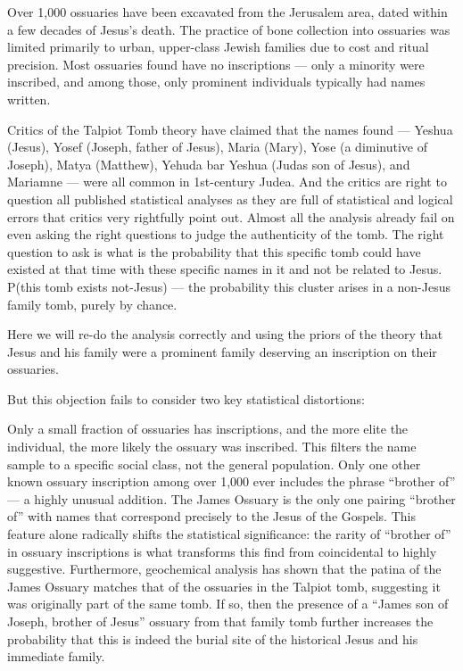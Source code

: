 Over 1,000 ossuaries have been excavated from the Jerusalem area, dated within a few decades of Jesus's death.
The practice of bone collection into ossuaries was limited primarily to urban, upper-class Jewish families due to cost and ritual precision.
Most ossuaries found have no inscriptions --- only a minority were inscribed, and among those, only prominent individuals typically had names written.

Critics of the Talpiot Tomb theory have claimed that the names found --- Yeshua (Jesus), Yosef (Joseph, father of Jesus), Maria (Mary), Yose (a diminutive of Joseph), Matya (Matthew), Yehuda bar Yeshua (Judas son of Jesus), and Mariamne --- were all common in 1st-century Judea.
And the critics are right to question all published statistical analyses as they are full of statistical and logical errors that critics very rightfully point out.
Almost all the analysis already fail on even asking the right questions to judge the authenticity of the tomb.
The right question to ask is what is the probability that this specific tomb could have existed at that time with these specific names in it and not be related to Jesus.
P(this tomb exists \textbar{} not-Jesus) --- the probability this cluster arises in a non-Jesus family tomb, purely by chance.

Here we will re-do the analysis correctly and using the priors of the theory that Jesus and his family were a prominent family deserving an inscription on their ossuaries.

But this objection fails to consider two key statistical distortions:

Only a small fraction of ossuaries has inscriptions, and the more elite the individual, the more likely the ossuary was inscribed.
This filters the name sample to a specific social class, not the general population.
Only one other known ossuary inscription among over 1,000 ever includes the phrase ``brother of'' --- a highly unusual addition.
The James Ossuary is the only one pairing ``brother of'' with names that correspond precisely to the Jesus of the Gospels.
This feature alone radically shifts the statistical significance: the rarity of ``brother of'' in ossuary inscriptions is what transforms this find from coincidental to highly suggestive.
Furthermore, geochemical analysis has shown that the patina of the James Ossuary matches that of the ossuaries in the Talpiot tomb, suggesting it was originally part of the same tomb.
If so, then the presence of a ``James son of Joseph, brother of Jesus'' ossuary from that family tomb further increases the probability that this is indeed the burial site of the historical Jesus and his immediate family.

